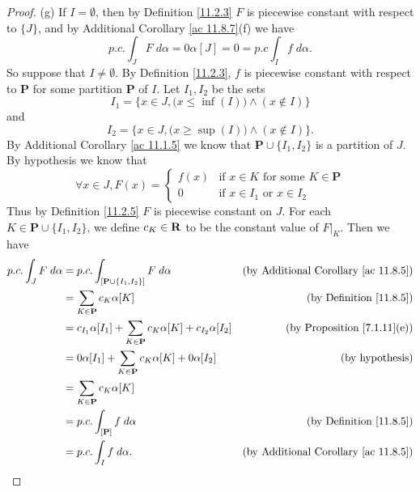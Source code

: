 \begin{proof}{(g)}
    If \(I = \emptyset\), then by Definition \ref{11.2.3} \(F\) is piecewise constant with respect to \(\{J\}\), and by Additional Corollary \ref{ac 11.8.7}(f) we have
    \[
        p.c. \int_J F \; d \alpha = 0 \alpha[J] = 0 = p.c \int_I f \; d \alpha.
    \]
    So suppose that \(I \neq \emptyset\).
    By Definition \ref{11.2.3}, \(f\) is piecewise constant with respect to \(\mathbf{P}\) for some partition \(\mathbf{P}\) of \(I\).
    Let \(I_1, I_2\) be the sets
    \[
        I_1 = \Big\{x \in J, \big(x \leq \inf(I)\big) \land (x \notin I)\Big\}
    \]
    and
    \[
        I_2 = \Big\{x \in J, \big(x \geq \sup(I)\big) \land (x \notin I)\Big\}.
    \]
    By Additional Corollary \ref{ac 11.1.5} we know that \(\mathbf{P} \cup \{I_1, I_2\}\) is a partition of \(J\).
    By hypothesis we know that
    \[
        \forall x \in J, F(x) = \begin{cases}
            f(x) & \text{if } x \in K \text{ for some } K \in \mathbf{P} \\
            0    & \text{if } x \in I_1 \text{ or } x \in I_2
        \end{cases}
    \]
    Thus by Definition \ref{11.2.5} \(F\) is piecewise constant on \(J\).
    For each \(K \in \mathbf{P} \cup \{I_1, I_2\}\), we define \(c_K \in \mathbf{R}\) to be the constant value of \(F|_K\).
    Then we have
    \begin{align*}
        p.c. \int_J F \; d \alpha & = p.c. \int_{[\mathbf{P} \cup \{I_1, I_2\}]} F \; d \alpha                          & \text{(by Additional Corollary \ref{ac 11.8.5})} \\
                                  & = \sum_{K \in \mathbf{P}} c_K \alpha[K]                                             & \text{(by Definition \ref{11.8.5})}              \\
                                  & = c_{I_1} \alpha[I_1] + \sum_{K \in \mathbf{P}} c_K \alpha[K] + c_{I_2} \alpha[I_2] & \text{(by Proposition \ref{7.1.11}(e))}          \\
                                  & = 0 \alpha[I_1] + \sum_{K \in \mathbf{P}} c_K \alpha[K] + 0 \alpha[I_2]             & \text{(by hypothesis)}                           \\
                                  & = \sum_{K \in \mathbf{P}} c_K \alpha[K]                                                                                                \\
                                  & = p.c. \int_{[\mathbf{P}]} f \; d \alpha                                            & \text{(by Definition \ref{11.8.5})}              \\
                                  & = p.c. \int_I f \; d \alpha.                                                        & \text{(by Additional Corollary \ref{ac 11.8.5})}
    \end{align*}
\end{proof}

